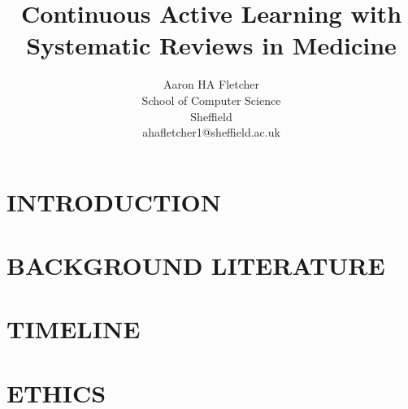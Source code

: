 \documentclass[10pt, english]{article}
\title{\textbf{Continuous Active Learning with Systematic Reviews in Medicine}}
\author{
    \fontsize{11}{13}\selectfont 
    Aaron HA Fletcher \\
    \fontsize{10}{11}\selectfont 
     School of Computer Science\\
    \fontsize{10}{11}\selectfont 
    Sheffield\\
    \fontsize{10}{11}\selectfont
    ahafletcher1@sheffield.ac.uk\\
}
\date{}
\begin{document}
\renewcommand{\abstractname}{} %
\maketitle %
\newpage


\newpage


\setlength{\absleftindent}{0em}
\setlength{\absrightindent}{0em}

\begin{abstract}
\newpage 
    \abstractText %
\end{abstract}
\newpage
\tableofcontents
\newpage
\newcommand{\lightshadowbox}[1]{%
  \setlength{\fboxsep}{6pt}%
  \setlength{\shadowsize}{1pt}%
  \shadowbox{#1}%
}

\newpage
\section{INTRODUCTION}


\newpage
\section{BACKGROUND LITERATURE}

\newpage




\newpage




\newpage

% 


\newpage
\newpage
\section{TIMELINE}

\newpage
\section{ETHICS}

\newpage
\end{document}
